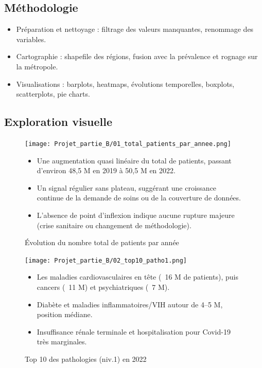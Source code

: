 \documentclass[12pt,a4paper]{article}
\begin{document}
\subsection{Méthodologie}
\begin{itemize}
  \item Préparation et nettoyage : filtrage des valeurs manquantes, renommage des variables.
  \item Cartographie : shapefile des régions, fusion avec la prévalence et rognage sur la métropole.
  \item Visualisations : barplots, heatmaps, évolutions temporelles, boxplots, scatterplots, pie charts.
\end{itemize}

\subsection{Exploration visuelle}

\begin{figure}[H]
  \centering
  \begin{minipage}[t]{0.6\textwidth}
    \centering
    \texttt{[image: Projet\_partie\_B/01\_total\_patients\_par\_annee.png]}
    \caption{Évolution du nombre total de patients par année}
    \label{fig:total_patients}
  \end{minipage}
    \begin{itemize}
      \item Une augmentation quasi linéaire du total de patients, passant d’environ 48,5 M en 2019 à 50,5 M en 2022.  
      \item Un signal régulier sans plateau, suggérant une croissance continue de la demande de soins ou de la couverture de données.  
      \item L’absence de point d'inflexion indique aucune rupture majeure (crise sanitaire ou changement de méthodologie).  
    \end{itemize}
\end{figure}

\begin{figure}[H]
  \centering
  \begin{minipage}[t]{0.7\textwidth}
    \centering
    \texttt{[image: Projet\_partie\_B/02\_top10\_patho1.png]}
    \caption{Top 10 des pathologies (niv.1) en 2022}
    \label{fig:top10_patho}
  \end{minipage}
    \begin{itemize}
      \item Les maladies cardiovasculaires en tête (~16 M de patients), puis cancers (~11 M) et psychiatriques (~7 M).  
      \item Diabète et maladies inflammatoires/VIH autour de 4–5 M, position médiane.  
      \item Insuffisance rénale terminale et hospitalisation pour Covid-19 très marginales.  
    \end{itemize}
\end{figure}
\end{document}
